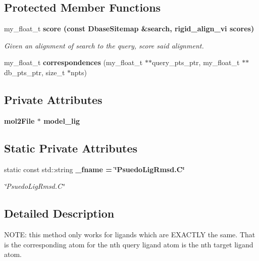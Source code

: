 \subsection*{Protected Member Functions}
\begin{CompactItemize}
\item 
my\_\-float\_\-t \bf{score} (const \bf{Dbase\-Sitemap} \&search, rigid\_\-align\_\-vi scores)
\begin{CompactList}\small\item\em Given an alignment of search to the query, score said alignment. \item\end{CompactList}\item 
my\_\-float\_\-t \textbf{correspondences} (my\_\-float\_\-t $\ast$$\ast$query\_\-pts\_\-ptr, my\_\-float\_\-t $\ast$$\ast$db\_\-pts\_\-ptr, size\_\-t $\ast$npts)\label{classASCbase_1_1PsuedoLigRmsd_69e79ac94abe9233c291ecaccc6cae2e}

\end{CompactItemize}
\subsection*{Private Attributes}
\begin{CompactItemize}
\item 
\bf{mol2File} $\ast$ \textbf{model\_\-lig}\label{classASCbase_1_1PsuedoLigRmsd_c2c74580d19f2a232ad85eec12641ebe}

\end{CompactItemize}
\subsection*{Static Private Attributes}
\begin{CompactItemize}
\item 
static const std::string \bf{\_\-fname} = \char`\"{}Psuedo\-Lig\-Rmsd.C\char`\"{}\label{classASCbase_1_1PsuedoLigRmsd_2f21de3bff3a23947a0f443dd906c0bc}

\begin{CompactList}\small\item\em \char`\"{}Psuedo\-Lig\-Rmsd.C\char`\"{} \item\end{CompactList}\end{CompactItemize}


\subsection{Detailed Description}
NOTE: this method only works for ligands which are EXACTLY the same. That is the corresponding atom for the nth query ligand atom is the nth target ligand atom. 



